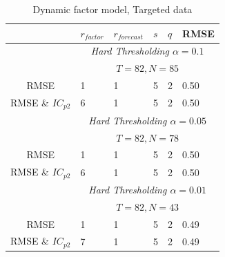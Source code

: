 \documentclass[12pt]{article}
\begin{document}
\begin{table}[ht]
	\centering
	\begin{tabular}{c|lllll}
		   & $r_{factor}$ & $r_{forecast}$ & $s$ & $q$ & RMSE\\
		 \hline
		 \hline
		  & \multicolumn{5}{c}{\textit{Hard Thresholding $\alpha=0.1$}} \\ 
		  & \multicolumn{5}{c}{$T=82, N=85$} \\
		  \hline
		   	RMSE & 1 & 1 & 5 & 2 & 0.50 \\
		   	RMSE \& $IC_{p2}$ & 6 & 1 & 5 & 2 & 0.50 \\
		 \hline
 		 \hline
		  & \multicolumn{5}{c}{\textit{Hard Thresholding $\alpha=0.05$}} \\ 
 		 & \multicolumn{5}{c}{$T=82, N=78$} \\
		  \hline
		   	RMSE & 1 & 1 & 5 & 2 & 0.50 \\
		   	RMSE \& $IC_{p2}$ & 6 & 1 & 5 & 2 & 0.50 \\
		 \hline
 		 \hline
 		 & \multicolumn{5}{c}{\textit{Hard Thresholding $\alpha=0.01$}} \\ 
 		 & \multicolumn{5}{c}{$T=82, N=43$} \\
		  \hline
		   	RMSE & 1 & 1 & 5 & 2 & 0.49 \\
		   	RMSE \& $IC_{p2}$ & 7 & 1 & 5 & 2 & 0.49 \\
		 \hline
 		 \hline
 		 
	\end{tabular}
	\caption{Dynamic factor model, Targeted data}
	\label{results dynamic factor model, targeted data sets}
\end{table}
\end{document}

